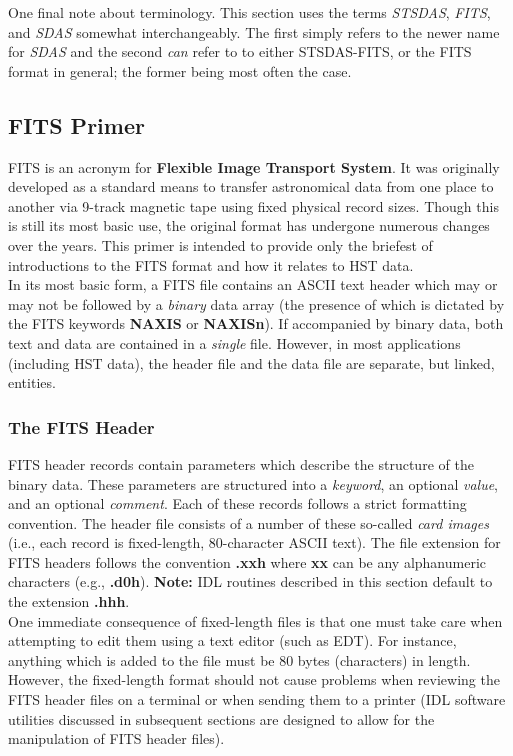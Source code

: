 One final note about terminology.  This section uses the terms {\it STSDAS}, 
{\it FITS}, and {\it SDAS} somewhat interchangeably.  The first simply 
refers to the newer name for {\it SDAS} and the second {\it can} refer to 
to either STSDAS-FITS, or the FITS format in general; the former being most
often the case.

\subsection{\bf FITS Primer}

FITS is an acronym for {\bf Flexible Image Transport System}.  It was 
originally developed as a standard means to transfer astronomical data from
one place to another via 9-track magnetic tape using fixed physical record
sizes.  Though this is still its most basic use, the original
format has undergone numerous changes over the years.  This primer is intended
to provide only the briefest of introductions to the FITS format and how it
relates 
to HST data.\\

In its most basic form, a FITS file contains an ASCII text header
which may or may not be followed by a {\it binary} data array (the
presence of which is dictated by the FITS keywords {\bf NAXIS} or {\bf
NAXISn}).  If accompanied by binary data, both text and data are
contained in a {\it single} file.  However, in most applications
(including HST data), the header file and the data file are separate,
but linked, entities. 

\subsubsection{\bf The FITS Header}
FITS header records contain parameters which describe the structure of the 
binary data.   These parameters are structured into a {\it keyword}, an 
optional {\it value}, and an optional {\it comment}.  Each of these records 
follows a strict formatting convention.  The header file consists of a number 
of these so-called {\it card images} (i.e., each record is fixed-length, 
80-character ASCII text).  The file extension for FITS headers follows the 
convention {\bf .xxh} where {\bf xx} can be any alphanumeric characters 
(e.g., {\bf .d0h}).  {\bf Note:} IDL routines described in this section 
default to the extension {\bf .hhh}.\\

One immediate consequence of fixed-length files is that one must take
care when attempting to edit them using a text editor (such as EDT). 
For instance, anything which is added to the file must be 80 bytes
(characters) in length.  However, the fixed-length format should not
cause problems when reviewing the FITS header files on a terminal
or when sending them to a printer (IDL software utilities discussed in
subsequent sections are designed to allow for the manipulation of FITS
header files). 


